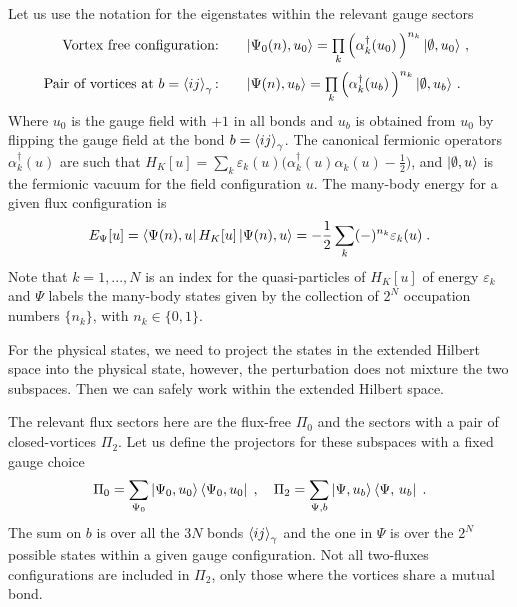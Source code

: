 Let us use the notation for the eigenstates within the relevant gauge sectors
\begin{equation}\!\!\!
    \begin{array}{rcl}
         \text{Vortex free configuration:}          & &   \ket{\Psi_0(n),u_0} = \prod\limits_{k} \left( \alpha_{k}^{\dagger}(u_0)\,\right)^{n_{k}} \ket{\emptyset,u_0} \, ,
         \\[12pt]
         \text{Pair of vortices at }b=\braket{ij}_\gamma\text{:} & &
         \ket{\Psi(n),u_b} = \prod\limits_{k} \left( \alpha_{k}^{\dagger}(u_b)\,\right)^{n_{k}}\ket{\emptyset,u_b}
           \, .
    \end{array}
\end{equation}
Where $u_0$ is the gauge field with $+1$ in all bonds and $u_b$ is obtained from $u_0$ by flipping the gauge field at the bond $b=\braket{ij}_\gamma$.
The canonical fermionic operators $\alpha^{\dagger}_k(u)$ are such that $ H_{K}[u] = \sum_{k} \varepsilon_k(u) \big( \alpha^{\dagger}_k(u) \alpha^{\phantom{\dagger}}_k(u) - \frac{1}{2} \big)$, and $\ket{\emptyset,u}$ is the fermionic vacuum for the field configuration $u$.
The many-body energy for a given flux configuration is
\begin{equation}
    E_\Psi[u]=\bra{\Psi(n),u} H_{K}[u] \ket{\Psi(n),u} = - \frac12  \sum_{k} (-)^{n_k}\varepsilon_k(u) \; . \label{C:many-body-energy}
\end{equation}
Note that $k=1,...,N$ is an index for the quasi-particles of $ H_{K}[u]$ of energy $\varepsilon_k$ and $\Psi$ labels the many-body states given by the collection of $2^N$ occupation numbers $\{n_k\}$, with $n_k\in\{0,1\}$.

For the physical states, we need to project the states in the extended Hilbert space into the physical state, however, the perturbation does not mixture the two subspaces. Then we can safely work within the extended Hilbert space.

The relevant flux sectors here are the flux-free $\Pi_0$ and the sectors with a pair of closed-vortices $\Pi_2$. Let us define the projectors for these subspaces with a fixed gauge choice
\begin{equation}
    \Pi_0 = \sum_{\Psi_0} \ket{\Psi_0,u_0} \bra{\Psi_0,u_0} \; , \quad \Pi_2 = \sum_{\Psi,b} \ket{\Psi,u_b} \bra{\Psi, \, u_b}  \; .
\end{equation}
The sum on $b$ is over all the $3N$ bonds $\braket{ij}_\gamma$ and the one in $\Psi$ is over the $2^N$ possible states within a given gauge configuration.
Not all two-fluxes configurations are included in $\Pi_2$, only those where the vortices share a mutual bond.

